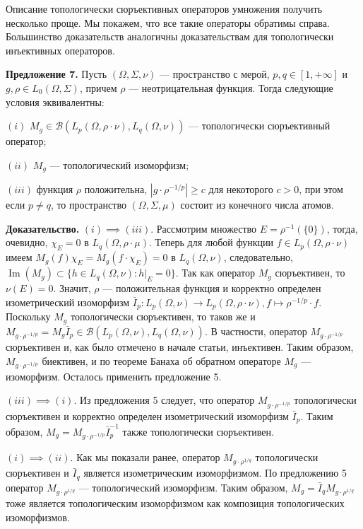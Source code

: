 \documentclass[11pt,twoside]{article}
\begin{document}
Описание топологически сюръективных операторов умножения получить несколько
проще. Мы покажем, что все такие операторы обратимы справа. Большинство
доказательств аналогичны доказательствам для топологически инъективных
операторов.

\textbf{Предложение 7.} Пусть $(\Omega,\Sigma,\nu)$ --- пространство с мерой,
$p,q\in[1,+\infty]$ и $g,\rho\in L_0(\Omega,\Sigma)$, причем $\rho$ ---
неотрицательная функция. Тогда следующие условия эквивалентны:

$(i)$ $M_g\in\mathcal{B}(L_p(\Omega,\rho\cdot\nu),L_q(\Omega,\nu))$ ---
топологически сюръективный оператор;

$(ii)$ $M_g$ --- топологический изоморфизм;

$(iii)$ функция $\rho$ положительна, $|g\cdot \rho^{-1/p}|\geq c$ для некоторого
$c>0$, при этом если $p\neq q$, то пространство $(\Omega,\Sigma,\mu)$ состоит из
конечного числа атомов.


\textbf{Доказательство.} $(i)$$\implies$$(iii)$. Рассмотрим множество
    $E=\rho^{-1}(\{0\})$, тогда, очевидно, $\chi_E=0$ в
    $L_q(\Omega,\rho\cdot\mu)$. Теперь для любой функции $f\in
    L_p(\Omega,\rho\cdot\nu)$ имеем $M_g(f)\chi_E=M_g(f\cdot\chi_E)=0$ в
    $L_q(\Omega,\nu)$, следовательно, $\operatorname{Im}(M_g)\subset \{h\in
    L_q(\Omega,\nu): h|_E=0 \}$. Так как оператор $M_g$ сюръективен, то
    $\nu(E)=0$. Значит, $\rho$ --- положительная функция и корректно определен
        изометрический изоморфизм $\bar{I}_p:L_p(\Omega,\nu)\to
    L_p(\Omega,\rho\cdot\nu),f\mapsto \rho^{-1/p}\cdot f$. Поскольку $M_g$
        топологически сюръективен, то таков же и $M_{g\cdot\rho^{-1/p}}=M_g
    \bar{I}_p\in\mathcal{B}(L_p(\Omega,\nu),L_q(\Omega,\nu))$. В частности,
        оператор $M_{g\cdot\rho^{-1/p}}$ сюръективен и, как было отмечено в начале
        статьи, инъективен. Таким образом, $M_{g\cdot\rho^{-1/p}}$ биективен, и по
        теореме Банаха об обратном операторе $M_g$ --- изоморфизм. Осталось
        применить предложение 5.

    $(iii)$$\implies$$ (i)$. Из предложения 5 следует, что оператор
    $M_{g\cdot\rho^{-1/p}}$ топологически сюръективен и корректно определен
        изометрический изоморфизм $\bar{I}_p$. Таким образом, $M_g=
    M_{g\cdot\rho^{-1/p}}\bar{I}_p^{-1}$ также топологически сюръективен.

    $(i)$$\implies$$ (ii)$. Как мы показали ранее, оператор
    $M_{g\cdot\rho^{1/q}}$ топологически сюръективен и $\bar{I}_q$ является
        изометрическим изоморфизмом. По предложению 5 оператор
    $M_{g\cdot\rho^{1/q}}$ --- топологический изоморфизм. Таким образом,
    $M_g=\bar{I}_q M_{g\cdot\rho^{1/q}}$ тоже является топологическим
        изоморфизмом как композиция топологических изоморфизмов.
\end{document}
